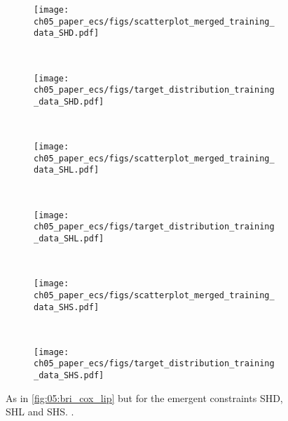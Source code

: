 \begin{figure}[p]
  \centering
  \begin{subfigure}[b]{\SubfigureWidth{}}
    \texttt{[image: 
      ch05\_paper\_ecs/figs/scatterplot\_merged\_training\_data\_SHD.pdf]}
    \caption{}
    \label{fig:05:shd_shl_shs:a}
  \end{subfigure}
  ~
  \begin{subfigure}[b]{\SubfigureWidth{}}
    \texttt{[image: 
      ch05\_paper\_ecs/figs/target\_distribution\_training\_data\_SHD.pdf]}
    \caption{}
    \label{fig:05:shd_shl_shs:b}
  \end{subfigure}
  \\
  \begin{subfigure}[b]{\SubfigureWidth{}}
    \texttt{[image: 
      ch05\_paper\_ecs/figs/scatterplot\_merged\_training\_data\_SHL.pdf]}
    \caption{}
    \label{fig:05:shd_shl_shs:c}
  \end{subfigure}
  ~
  \begin{subfigure}[b]{\SubfigureWidth{}}
    \texttt{[image: 
      ch05\_paper\_ecs/figs/target\_distribution\_training\_data\_SHL.pdf]}
    \caption{}
    \label{fig:05:shd_shl_shs:d}
  \end{subfigure}
  \\
  \begin{subfigure}[b]{\SubfigureWidth{}}
    \texttt{[image: 
      ch05\_paper\_ecs/figs/scatterplot\_merged\_training\_data\_SHS.pdf]}
    \caption{}
    \label{fig:05:shd_shl_shs:e}
  \end{subfigure}
  ~
  \begin{subfigure}[b]{\SubfigureWidth{}}
    \texttt{[image: 
      ch05\_paper\_ecs/figs/target\_distribution\_training\_data\_SHS.pdf]}
    \caption{}
    \label{fig:05:shd_shl_shs:f}
  \end{subfigure}
  \caption{As in \cref{fig:05:bri_cox_lip} but for the emergent constraints
    SHD, SHL and SHS. .}
  \label{fig:05:shd_shl_shs}
\end{figure}

